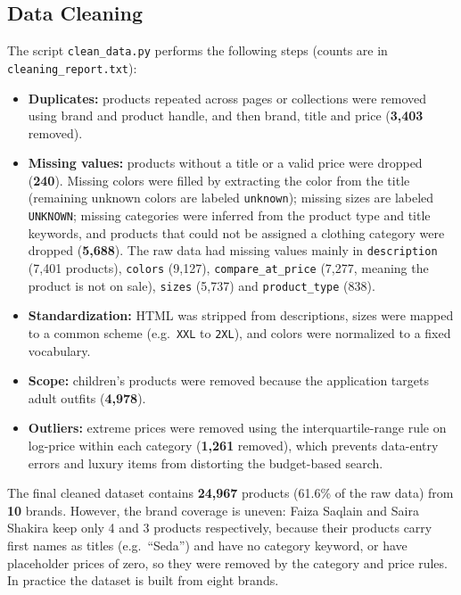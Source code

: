 \subsection{Data Cleaning}
The script \texttt{clean\_data.py} performs the following steps (counts are in \texttt{cleaning\_report.txt}):
\begin{itemize}
  \item \textbf{Duplicates:} products repeated across pages or collections were removed using brand and product handle, and then brand, title and price (\textbf{3,403} removed).
  \item \textbf{Missing values:} products without a title or a valid price were dropped (\textbf{240}). Missing colors were filled by extracting the color from the title (remaining unknown colors are labeled \texttt{unknown}); missing sizes are labeled \texttt{UNKNOWN}; missing categories were inferred from the product type and title keywords, and products that could not be assigned a clothing category were dropped (\textbf{5,688}). The raw data had missing values mainly in \texttt{description} (7,401 products), \texttt{colors} (9,127), \texttt{compare\_at\_price} (7,277, meaning the product is not on sale), \texttt{sizes} (5,737) and \texttt{product\_type} (838).
  \item \textbf{Standardization:} HTML was stripped from descriptions, sizes were mapped to a common scheme (e.g.\ \texttt{XXL} to \texttt{2XL}), and colors were normalized to a fixed vocabulary.
  \item \textbf{Scope:} children's products were removed because the application targets adult outfits (\textbf{4,978}).
  \item \textbf{Outliers:} extreme prices were removed using the interquartile-range rule on log-price within each category (\textbf{1,261} removed), which prevents data-entry errors and luxury items from distorting the budget-based search.
\end{itemize}
The final cleaned dataset contains \textbf{24,967} products (61.6\% of the raw data) from \textbf{10} brands. However, the brand coverage is uneven: Faiza Saqlain and Saira Shakira keep only 4 and 3 products respectively, because their products carry first names as titles (e.g.\ ``Seda'') and have no category keyword, or have placeholder prices of zero, so they were removed by the category and price rules. In practice the dataset is built from eight brands.

